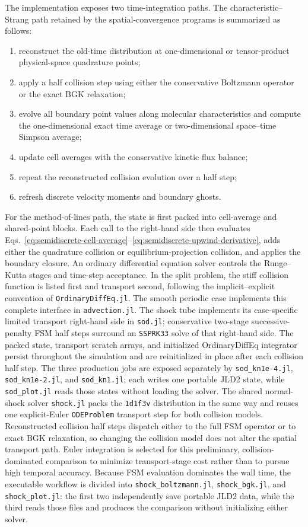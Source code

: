 \documentclass[preprint,3p,12pt]{elsarticle}
\begin{document}
The implementation exposes two time-integration paths. The characteristic--Strang path retained by the spatial-convergence programs is summarized as follows:
\begin{enumerate}
  \item reconstruct the old-time distribution at one-dimensional or tensor-product physical-space quadrature points;
  \item apply a half collision step using either the conservative Boltzmann operator or the exact BGK relaxation;
  \item evolve all boundary point values along molecular characteristics and compute the one-dimensional exact time average or two-dimensional space--time Simpson average;
  \item update cell averages with the conservative kinetic flux balance;
  \item repeat the reconstructed collision evolution over a half step;
  \item refresh discrete velocity moments and boundary ghosts.
\end{enumerate}
For the method-of-lines path, the state is first packed into cell-average and shared-point blocks. Each call to the right-hand side then evaluates Eqs.~\eqref{eq:semidiscrete-cell-average}--\eqref{eq:semidiscrete-upwind-derivative}, adds either the quadrature collision or equilibrium-projection collision, and applies the boundary closure. An ordinary differential equation solver controls the Runge--Kutta stages and time-step acceptance. In the split problem, the stiff collision function is listed first and transport second, following the implicit--explicit convention of \texttt{OrdinaryDiffEq.jl}. The smooth periodic case implements this complete interface in \texttt{advection.jl}. The shock tube implements its case-specific limited transport right-hand side in \texttt{sod.jl}; conservative two-stage successive-penalty FSM half steps surround an \texttt{SSPRK33} solve of that right-hand side. The packed state, transport scratch arrays, and initialized OrdinaryDiffEq integrator persist throughout the simulation and are reinitialized in place after each collision half step. The three production jobs are exposed separately by \texttt{sod\_kn1e-4.jl}, \texttt{sod\_kn1e-2.jl}, and \texttt{sod\_kn1.jl}; each writes one portable JLD2 state, while \texttt{sod\_plot.jl} reads those states without loading the solver. The shared normal-shock solver \texttt{shock.jl} packs the \texttt{1d1f3v} distribution in the same way and reuses one explicit-Euler \texttt{ODEProblem} transport step for both collision models. Reconstructed collision half steps dispatch either to the full FSM operator or to exact BGK relaxation, so changing the collision model does not alter the spatial transport path. Euler integration is selected for this preliminary, collision-dominated comparison to minimize transport-stage cost rather than to pursue high temporal accuracy. Because FSM evaluation dominates the wall time, the executable workflow is divided into \texttt{shock\_boltzmann.jl}, \texttt{shock\_bgk.jl}, and \texttt{shock\_plot.jl}: the first two independently save portable JLD2 data, while the third reads those files and produces the comparison without initializing either solver.
\end{document}
